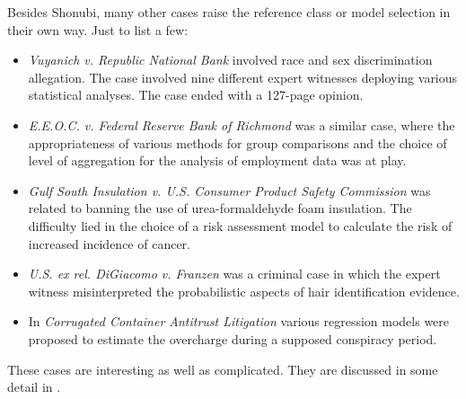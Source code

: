 \documentclass{article}
\begin{document}

Besides Shonubi, many other cases raise the reference class or model selection in their own way. Just to list a few:
\begin{itemize}
	\item \emph{Vuyanich v. Republic National Bank} involved race and sex discrimination allegation.  The case involved nine different  expert witnesses deploying various statistical analyses. The case ended with a 127-page opinion.
	\item \emph{E.E.O.C. v. Federal Reserve Bank of Richmond} was a similar case, where the appropriateness of various methods for group comparisons and the choice of level of aggregation for the analysis of employment data was at play.
	\item  \emph{Gulf South Insulation v. U.S. Consumer Product Safety Commission} was related to banning the use of urea-formaldehyde foam insulation. The difficulty lied in the  choice of a risk assessment model to calculate the risk of increased incidence of cancer.
	\item \emph{U.S. ex rel. DiGiacomo v. Franzen} was a criminal case in which the expert witness misinterpreted the probabilistic aspects of hair identification evidence.
	\item In \emph{Corrugated Container Antitrust Litigation} various regression models were proposed to estimate the overcharge during a supposed conspiracy period.
\end{itemize}
These cases are interesting as well as complicated. They are discussed in some detail in \citep{fienberg1989evolving}. 










\end{document}

